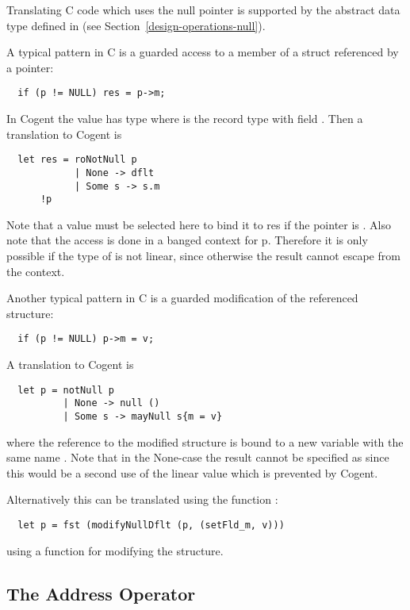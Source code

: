 Translating C code which uses the null pointer is supported by the abstract data type  defined
in  (see Section~\ref{design-operations-null}).

A typical pattern in C is a guarded access to a member of a struct referenced by a pointer:
\begin{verbatim}
  if (p != NULL) res = p->m;
\end{verbatim}
In Cogent the value  has type  where  is the record type with field . 
Then a translation to Cogent is
\begin{verbatim}
  let res = roNotNull p 
            | None -> dflt
            | Some s -> s.m
      !p
\end{verbatim}
Note that a value  must be selected here to bind it to res if the pointer is . Also note that the access is
done in a banged context for p. Therefore it is only possible if the type of  is not linear, since otherwise the result
cannot escape from the context.

Another typical pattern in C is a guarded modification of the referenced structure:
\begin{verbatim}
  if (p != NULL) p->m = v;
\end{verbatim}
A translation to Cogent is
\begin{verbatim}
  let p = notNull p 
          | None -> null ()
          | Some s -> mayNull s{m = v}
\end{verbatim}
where the reference to the modified structure is bound to a new variable with the same name . 
Note that in the None-case the result cannot be specified as 
 since this would be a second use of the linear value  which is prevented by Cogent.

Alternatively this can be translated using the function :
\begin{verbatim}
  let p = fst (modifyNullDflt (p, (setFld_m, v)))
\end{verbatim}
using a function  for modifying the structure.

\subsection{The Address Operator \code{\&}}
\label{app-transfunction-addrop}

